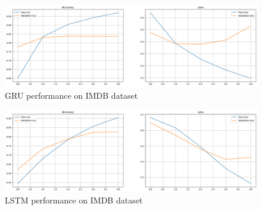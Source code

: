 \documentclass[12pt,a4paper]{article}
\begin{document}
\begin{figure}[h!]
    \centering
    \includegraphics[width=1\textwidth]{../Pic/gru_performance.png} 
    \caption{GRU performance on IMDB dataset}
\end{figure}
\begin{figure}[h!]
    \centering
    \includegraphics[width=1\textwidth]{../Pic/lstm_performance.png}
    \caption{LSTM performance on IMDB dataset}
\end{figure}

\newpage







\printbibliography
\end{document}
